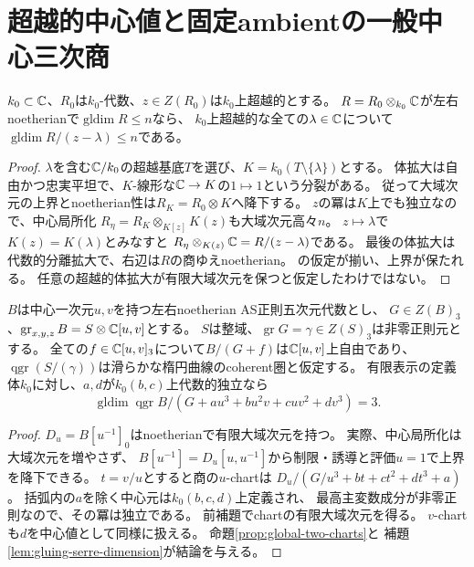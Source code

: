 \section{超越的中心値と固定ambientの一般中心三次商}
\label{sec:quotient-generic-central-values}
\begin{lemma}[超越的中心値の有限大域次元]
\label{lem:global-transcendental}
$k_0\subset\mathbb C$、$R_0$は$k_0$-代数、$z\in Z(R_0)$は$k_0$上超越的とする。
$R=R_0\otimes_{k_0}\mathbb C$が左右noetherianで$\operatorname{gldim}R\le n$なら、
$k_0$上超越的な全ての$\lambda\in\mathbb C$について
$\operatorname{gldim}R/(z-\lambda)\le n$である。
\end{lemma}
\begin{proof}
$\lambda$を含む$\mathbb C/k_0$の超越基底$T$を選び、$K=k_0(T\setminus\{\lambda\})$とする。
体拡大は自由かつ忠実平坦で、$K$-線形な$\mathbb C\to K$の$1\mapsto1$という分裂がある。
従って大域次元の上界とnoetherian性は$R_K=R_0\otimes K$へ降下する。
$z$の冪は$K$上でも独立なので、中心局所化
$R_\eta=R_K\otimes_{K[z]}K(z)$も大域次元高々$n$。
$z\mapsto\lambda$で$K(z)=K(\lambda)$とみなすと
$R_\eta\otimes_{K(z)}\mathbb C=R/(z-\lambda)$である。
最後の体拡大は代数的分離拡大で、右辺は$R$の商ゆえnoetherian。
\cite[Lemmas~3.2, 3.3]{RSVBertini}の仮定が揃い、上界が保たれる。
任意の超越的体拡大が有限大域次元を保つと仮定したわけではない。
\end{proof}

\begin{theorem}
\label{thm:global-very-general}
$B$は中心一次元$u,v$を持つ左右noetherian AS正則五次元代数とし、
$G\in Z(B)_3$、$\operatorname{gr}_{x,y,z}B=S\otimes\mathbb C[u,v]$とする。
$S$は整域、$\operatorname{gr}G=\gamma\in Z(S)_3$は非零正則元とする。
全ての$f\in\mathbb C[u,v]_3$について$B/(G+f)$は$\mathbb C[u,v]$上自由であり、
$\operatorname{qgr}(S/(\gamma))$は滑らかな楕円曲線のcoherent圏と仮定する。
有限表示の定義体$k_0$に対し、$a,d$が$k_0(b,c)$上代数的独立なら
\[
 \operatorname{gldim}\operatorname{qgr}
 B/(G+au^3+bu^2v+cuv^2+dv^3)=3.
\]
\end{theorem}
\begin{proof}
$D_u=B[u^{-1}]_0$はnoetherianで有限大域次元を持つ。
実際、中心局所化は大域次元を増やさず、
$B[u^{-1}]=D_u[u,u^{-1}]$から制限・誘導と評価$u=1$で上界を降下できる。
$t=v/u$とすると商の$u$-chartは
$D_u/(G/u^3+bt+ct^2+dt^3+a)$。
括弧内の$a$を除く中心元は$k_0(b,c,d)$上定義され、
最高主変数成分が非零正則なので、その冪は独立である。
前補題でchartの有限大域次元を得る。
$v$-chartも$d$を中心値として同様に扱える。
命題\ref{prop:global-two-charts}と
補題\ref{lem:gluing-serre-dimension}が結論を与える。
\end{proof}

